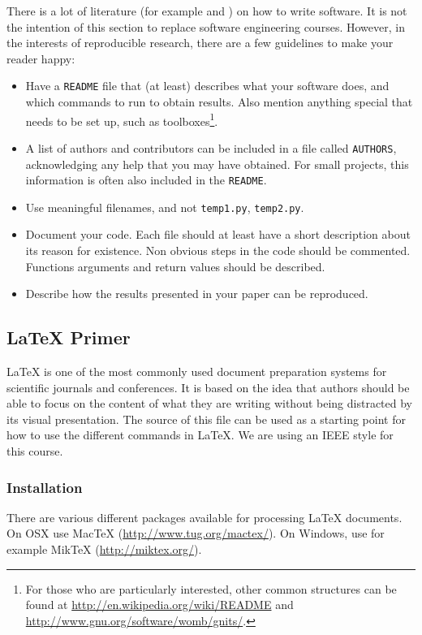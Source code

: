\documentclass[10pt,conference,compsocconf]{IEEEtran}
\begin{document}
There is a lot of literature (for example and
) on how to write software. It is not the
intention of this section to replace software engineering
courses. However, in the interests of reproducible
research, there are a few guidelines to make your
reader happy:
\begin{itemize}
\item Have a \texttt{README} file that (at least) describes what your
  software does, and which commands to run to obtain results. Also
  mention anything special that needs to be set up, such as
  toolboxes\footnote{For those who are
  particularly interested, other common structures can be found at
  \url{http://en.wikipedia.org/wiki/README} and
  \url{http://www.gnu.org/software/womb/gnits/}.}.
\item A list of authors and contributors can be included in a file
  called \texttt{AUTHORS}, acknowledging any help that you may have
  obtained. For small projects, this information is often also
  included in the \texttt{README}.
\item Use meaningful filenames, and not \texttt{temp1.py},
  \texttt{temp2.py}. 
\item Document your code. Each file should at least have a short
  description about its reason for existence. Non obvious steps in the
  code should be commented. Functions arguments and return values should be described.
\item Describe how the results presented in your paper can be reproduced.
\end{itemize}


\subsection{\LaTeX{} Primer}
\label{sec:latex-primer}

\LaTeX{} is one of the most commonly used document preparation systems
for scientific journals and conferences. It is based on the idea
that authors should be able to focus on the content of what they are
writing without being distracted by its visual presentation.
The source of this file can be used as a starting point for how to use
the different commands in \LaTeX{}. We are using an IEEE style for
this course.

\subsubsection{Installation}

There are various different packages available for processing \LaTeX{}
documents.
On OSX use Mac\TeX{}
(\url{http://www.tug.org/mactex/}). On Windows, use for example Mik\TeX{} (\url{http://miktex.org/}).
\end{document}
